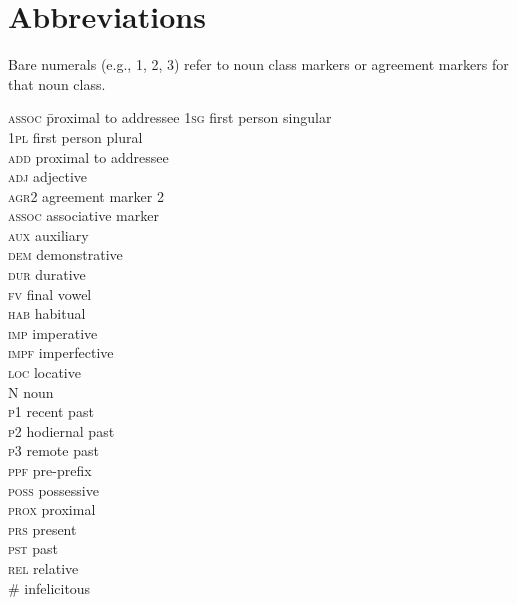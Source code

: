 \documentclass[output=paper,modfonts,nonflat]{langsci/langscibook}
\begin{document}
\section*{Abbreviations}
Bare numerals (e.g., 1, 2, 3) refer to noun class markers or agreement markers for that noun class.
\begin{multicols}{2}
\begin{tabbing}
\textsc{assoc} \hspace{.5em} \= proximal to addressee\kill
\textsc{1sg} \> first person singular\\
\textsc{1pl} \> first person plural\\
\textsc{add} \> proximal to addressee\\
\textsc{adj} \> adjective\\
\textsc{agr2} \> agreement marker 2\\
\textsc{assoc} \> associative marker\\
\textsc{aux} \> auxiliary\\
\textsc{dem} \> demonstrative\\
\textsc{dur} \> durative\\
\textsc{fv} \> final vowel\\
\textsc{hab} \> habitual\\
\textsc{imp} \> imperative\\
\textsc{impf} \> imperfective\\
\textsc{loc} \> locative\\
N \> noun\\
\textsc{p1} \> recent past\\
\textsc{p2} \> hodiernal past\\
\textsc{p3} \> remote past\\
\textsc{ppf} \> pre-prefix\\
\textsc{poss} \> possessive\\
\textsc{prox} \> proximal\\
\textsc{prs} \> present\\
\textsc{pst} \> past\\
\textsc{rel} \> relative\\
\# \> infelicitous
\end{tabbing}
\end{multicols}

{\sloppy\printbibliography[heading=subbibliography,notkeyword=this]}
\end{document}
